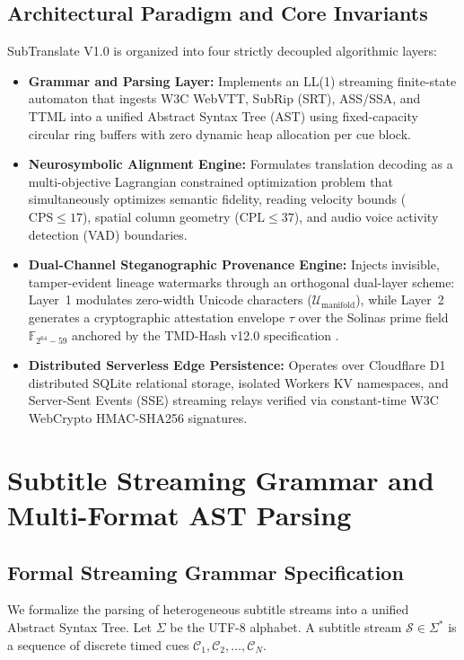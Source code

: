 \documentclass[11pt,a4paper,reqno]{article}
\theoremstyle{definition}
\theoremstyle{remark}
\begin{document}
\subsection{Architectural Paradigm and Core Invariants}
SubTranslate V1.0 is organized into four strictly decoupled algorithmic layers:
\begin{itemize}
    \item \textbf{Grammar and Parsing Layer:} Implements an LL(1) streaming finite-state automaton that ingests W3C WebVTT, SubRip (SRT), ASS/SSA, and TTML into a unified Abstract Syntax Tree (AST) using fixed-capacity circular ring buffers with zero dynamic heap allocation per cue block.
    \item \textbf{Neurosymbolic Alignment Engine:} Formulates translation decoding as a multi-objective Lagrangian constrained optimization problem that simultaneously optimizes semantic fidelity, reading velocity bounds ($\text{CPS} \le 17$), spatial column geometry ($\text{CPL} \le 37$), and audio voice activity detection (VAD) boundaries.
    \item \textbf{Dual-Channel Steganographic Provenance Engine:} Injects invisible, tamper-evident lineage watermarks through an orthogonal dual-layer scheme: Layer~1 modulates zero-width Unicode characters ($\mathcal{U}_{\text{manifold}}$), while Layer~2 generates a cryptographic attestation envelope $\tau$ over the Solinas prime field $\mathbb{F}_{2^{64}-59}$ anchored by the TMD-Hash v12.0 specification \cite{tmd_hash_v12}.
    \item \textbf{Distributed Serverless Edge Persistence:} Operates over Cloudflare D1 distributed SQLite relational storage, isolated Workers KV namespaces, and Server-Sent Events (SSE) streaming relays verified via constant-time W3C WebCrypto HMAC-SHA256 signatures.
\end{itemize}

\section{Subtitle Streaming Grammar and Multi-Format AST Parsing}
\label{sec:grammar}

\subsection{Formal Streaming Grammar Specification}
We formalize the parsing of heterogeneous subtitle streams into a unified Abstract Syntax Tree. Let $\Sigma$ be the UTF-8 alphabet. A subtitle stream $\mathcal{S} \in \Sigma^*$ is a sequence of discrete timed cues $\mathcal{C}_1, \mathcal{C}_2, \dots, \mathcal{C}_N$.
\end{document}
